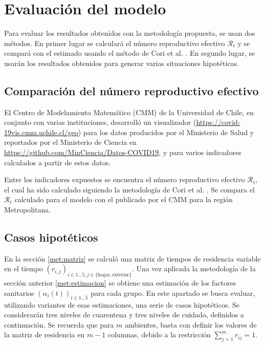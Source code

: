 \section{Evaluación del modelo} \label{met:evaluacion}

Para evaluar los resultados obtenidos con la metodología propuesta, se usan dos métodos. En primer lugar se calculará el número reproductivo efectivo \(\mathcal{R}_t\) y se compará con el estimado usando el método de Cori et al. \cite{Cori2013}. En segundo lugar, se usarán los resultados obtenidos para generar varias situaciones hipotéticas.

\subsection{Comparación del número reproductivo efectivo}

El Centro de Modelamiento Matemático (CMM) de la Universidad de Chile, en conjunto con varias instituciones, desarrolló un visualizador (\url{https://covid-19vis.cmm.uchile.cl/geo}) para los datos producidos por el Ministerio de Salud y reportados por el Ministerio de Ciencia en \url{https://github.com/MinCiencia/Datos-COVID19}, y para varios indicadores calculados a partir de estos datos.

Entre los indicadores expuestos se encuentra el número reproductivo efectivo \(\mathcal{R}_t\), el cual ha sido calculado siguiendo la metodología de Cori et al. \cite{Cori2013}. Se compara el \(\mathcal{R}_t\) calculado para el modelo con el publicado por el CMM para la región Metropolitana. 

\subsection{Casos hipotéticos}\label{met:evaluacion-hipot}

En la sección \ref{met:matriz} se calculó una matriz de tiempos de residencia variable en el tiempo \((r_{i,j})_{i \in 1\dots 5, j \in \{ \text{hogar}, \text{exterior}\}}\).  Una vez aplicada la metodología de la sección anterior \ref{met:estimacion} se obtiene una estimación de los factores sanitarios \((\alpha_i(t))_{i \in 1 \dots 5}\) para cada grupo. En este apartado se busca evaluar, utilizando variantes de esas estimaciones, una serie de casos hipotéticos. Se considerarán tres niveles de cuarentena y tres niveles de cuidado, definidos a continuación. Se recuerda que para \(m\) ambientes, basta con definir los valores de la matriz de residencia en \(m-1\) columnas, debido a la restricción \(\sum_{j = 1}^m r_{ij} = 1\). 

